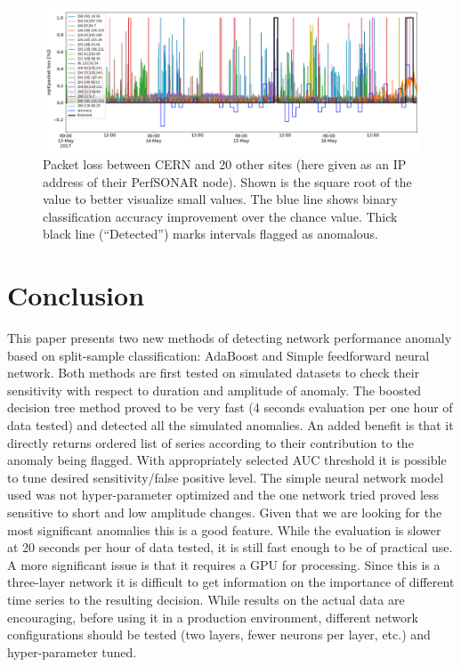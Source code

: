 \documentclass[5p]{elsarticle}
\begin{document}
\begin{figure}[htbp]
    \centering
    \includegraphics[width=\linewidth]{nn_all.png}
    \caption{Packet loss between CERN and 20 other sites (here given as an IP address of their PerfSONAR node). Shown is the square root of the value to better visualize small values. The blue line shows binary classification accuracy improvement over the chance value. Thick black line (“Detected”) marks intervals flagged as anomalous.}
    \label{fig:nn_all}
\end{figure}


\section{Conclusion}

This paper presents two new methods of detecting network performance anomaly based on split-sample classification: AdaBoost and Simple feedforward neural network. Both methods are first tested on simulated datasets to check their sensitivity with respect to duration and amplitude of anomaly. The boosted decision tree method proved to be very fast (4 seconds evaluation per one hour of data tested) and detected all the simulated anomalies. An added benefit is that it directly returns ordered list of series according to their contribution to the anomaly being flagged. With appropriately selected AUC threshold it is possible to tune desired sensitivity/false positive level. 
The simple neural network model used was not hyper-parameter optimized and the one network tried proved less sensitive to short and low amplitude changes. Given that we are looking for the most significant anomalies this is a good feature. While the evaluation is slower at 20 seconds per hour of data tested, it is still fast enough to be of practical use. A more significant issue is that it requires a GPU for processing. Since this is a three-layer network it is difficult to get information on the importance of different time series to the resulting decision. While results on the actual data are encouraging, before using it in a production environment, different network configurations should be tested (two layers, fewer neurons per layer, etc.) and hyper-parameter tuned.  
\end{document}
